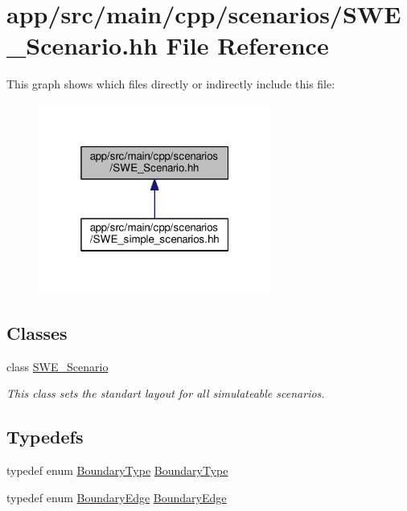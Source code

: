 \hypertarget{scenarios_2SWE__Scenario_8hh}{}\section{app/src/main/cpp/scenarios/\+S\+W\+E\+\_\+\+Scenario.hh File Reference}
\label{scenarios_2SWE__Scenario_8hh}
This graph shows which files directly or indirectly include this file\+:\nopagebreak
\begin{figure}[H]
\begin{center}
\leavevmode
\includegraphics[width=217pt]{scenarios_2SWE__Scenario_8hh__dep__incl}
\end{center}
\end{figure}
\subsection*{Classes}
\begin{DoxyCompactItemize}
\item 
class \hyperlink{classSWE__Scenario}{S\+W\+E\+\_\+\+Scenario}
\begin{DoxyCompactList}\small\item\em This class sets the standart layout for all simulateable scenarios. \end{DoxyCompactList}\end{DoxyCompactItemize}
\subsection*{Typedefs}
\begin{DoxyCompactItemize}
\item 
typedef enum \hyperlink{scenarios_2SWE__Scenario_8hh_af75d5dd7322fa39ed0af4e7839e600f8}{Boundary\+Type} \hyperlink{scenarios_2SWE__Scenario_8hh_a0076a482278ddc13ed179c6c76c9b5ad}{Boundary\+Type}
\item 
typedef enum \hyperlink{scenarios_2SWE__Scenario_8hh_aa5e01e3f7df312f7b9b0d02521141fcc}{Boundary\+Edge} \hyperlink{scenarios_2SWE__Scenario_8hh_a53b43e70a19e542b4c1ab2da9c6bcc0e}{Boundary\+Edge}
\end{DoxyCompactItemize}
